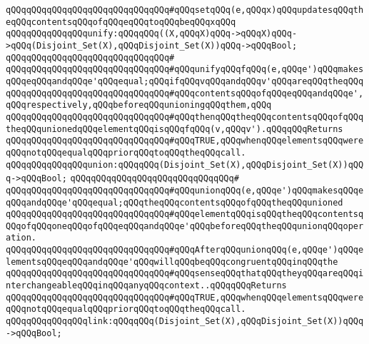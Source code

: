 \verb|qQQqqQQqqQQqqQQqqQQqqQQqqQQqqQQq#qQQqsetqQQq(e,qQQqx)qQQqupdatesqQQqtheqQQqcontentsqQQqofqQQqeqQQqtoqQQqbeqQQqxqQQq|\newline
\newline
\verb|qQQqqQQqqQQqqQQqunify:qQQqqQQq((X,qQQqX)qQQq->qQQqX)qQQq->qQQq(Disjoint_Set(X),qQQqDisjoint_Set(X))qQQq->qQQqBool;|\newline
\verb|qQQqqQQqqQQqqQQqqQQqqQQqqQQqqQQq#|\newline
\verb|qQQqqQQqqQQqqQQqqQQqqQQqqQQqqQQq#qQQqunifyqQQqfqQQq(e,qQQqe')qQQqmakesqQQqeqQQqandqQQqe'qQQqequal;qQQqifqQQqvqQQqandqQQqv'qQQqareqQQqtheqQQq|\newline
\verb|qQQqqQQqqQQqqQQqqQQqqQQqqQQqqQQq#qQQqcontentsqQQqofqQQqeqQQqandqQQqe',qQQqrespectively,qQQqbeforeqQQqunioningqQQqthem,qQQq|\newline
\verb|qQQqqQQqqQQqqQQqqQQqqQQqqQQqqQQq#qQQqthenqQQqtheqQQqcontentsqQQqofqQQqtheqQQqunionedqQQqelementqQQqisqQQqfqQQq(v,qQQqv').qQQqqQQqReturns|\newline
\verb|qQQqqQQqqQQqqQQqqQQqqQQqqQQqqQQq#qQQqTRUE,qQQqwhenqQQqelementsqQQqwereqQQqnotqQQqequalqQQqpriorqQQqtoqQQqtheqQQqcall.|\newline
\newline
\newline
\verb|qQQqqQQqqQQqqQQqunion:qQQqqQQq(Disjoint_Set(X),qQQqDisjoint_Set(X))qQQq->qQQqBool;|\newline
\verb|qQQqqQQqqQQqqQQqqQQqqQQqqQQqqQQq#|\newline
\verb|qQQqqQQqqQQqqQQqqQQqqQQqqQQqqQQq#qQQqunionqQQq(e,qQQqe')qQQqmakesqQQqeqQQqandqQQqe'qQQqequal;qQQqtheqQQqcontentsqQQqofqQQqtheqQQqunioned|\newline
\verb|qQQqqQQqqQQqqQQqqQQqqQQqqQQqqQQq#qQQqelementqQQqisqQQqtheqQQqcontentsqQQqofqQQqoneqQQqofqQQqeqQQqandqQQqe'qQQqbeforeqQQqtheqQQqunionqQQqoperation.|\newline
\verb|qQQqqQQqqQQqqQQqqQQqqQQqqQQqqQQq#qQQqAfterqQQqunionqQQq(e,qQQqe')qQQqelementsqQQqeqQQqandqQQqe'qQQqwillqQQqbeqQQqcongruentqQQqinqQQqthe|\newline
\verb|qQQqqQQqqQQqqQQqqQQqqQQqqQQqqQQq#qQQqsenseqQQqthatqQQqtheyqQQqareqQQqinterchangeableqQQqinqQQqanyqQQqcontext..qQQqqQQqReturns|\newline
\verb|qQQqqQQqqQQqqQQqqQQqqQQqqQQqqQQq#qQQqTRUE,qQQqwhenqQQqelementsqQQqwereqQQqnotqQQqequalqQQqpriorqQQqtoqQQqtheqQQqcall.|\newline
\newline
\newline
\verb|qQQqqQQqqQQqqQQqlink:qQQqqQQq(Disjoint_Set(X),qQQqDisjoint_Set(X))qQQq->qQQqBool;|\newline
